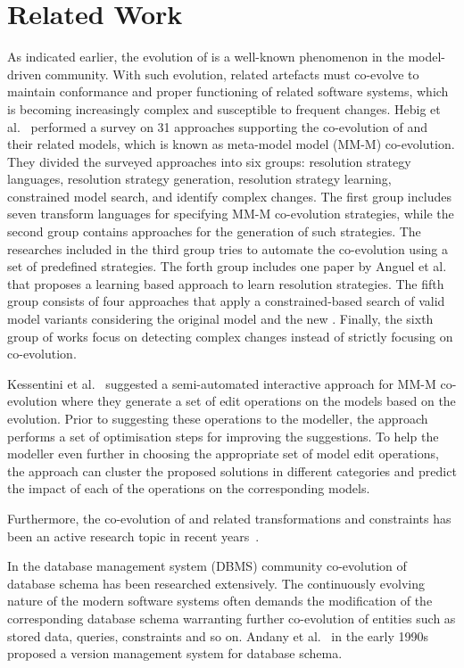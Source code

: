 \section{Related Work} \label{sec:RW}

As indicated earlier, the evolution of \metamodels is a well-known phenomenon in the model-driven community. With such evolution, related artefacts must co-evolve to maintain conformance and proper functioning of related software systems, which is becoming increasingly complex and susceptible to frequent changes. Hebig et al.~\autocite{Hebig2017} performed a survey on 31 approaches supporting the co-evolution of \metamodels and their related models, which is known as meta-model model (MM-M) co-evolution. They divided the surveyed approaches into six groups: resolution strategy languages, resolution strategy generation, resolution strategy learning, constrained model search, and identify complex changes. The first group includes seven transform languages for specifying MM-M co-evolution strategies, while the second group contains approaches for the generation of such strategies. The researches included in the third group tries to automate the co-evolution using a set of predefined strategies. The forth group includes one paper by Anguel et al.~\autocite{Anguel2013} that proposes a learning based approach to learn resolution strategies. The fifth group consists of four approaches that apply a constrained-based search of valid model variants considering the original model and the new \metamodel. Finally, the sixth group of works focus on detecting complex \metamodel changes instead of strictly focusing on co-evolution.

Kessentini et al.~\autocite{Kessentini2022} suggested a semi-automated interactive approach for MM-M co-evolution where they generate a set of edit operations on the models based on the \metamodel evolution. Prior to suggesting these operations to the modeller, the approach performs a set of optimisation steps for improving the suggestions. To help the modeller even further in choosing the appropriate set of model edit operations, the approach can cluster the proposed solutions in different categories and predict the impact of each of the operations on the corresponding models.

Furthermore, the co-evolution of \metamodel and related transformations and constraints has been an active research topic in recent years~\autocite{Kusel2015, Khelladi2017, garcia2013}.

In the database management system (DBMS) community co-evolution of database schema has been researched extensively. The continuously evolving nature of the modern software systems often demands the modification of the corresponding database schema warranting further co-evolution of entities such as stored data, queries, constraints and so on. Andany et al.~\autocite{andany1991management} in the early 1990s proposed a version management system for database schema.




